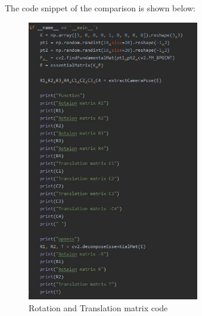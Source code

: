\documentclass[12pt]{article}
\begin{document}
\newline
The code snippet of the comparison is shown below:
\begin{figure}[h]
    \centering
    \includegraphics[width=7.5cm]{camecode}
    \caption{Rotation and Translation matrix code}
    \label{fig:Rotation and Translation matrix code}
\end{figure}
\end{document}
